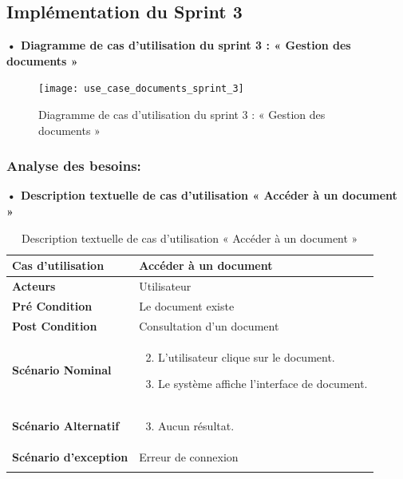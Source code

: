 \subsection{Implémentation du Sprint 3}
\textbf{•	Diagramme de cas d'utilisation du sprint 3 : « Gestion des documents »}

\begin{figure}[H]
  \centering
  \texttt{[image: use\_case\_documents\_sprint\_3]}
  \caption{Diagramme de cas d'utilisation du sprint 3 : « Gestion des documents »}
  \label{fig:UseCaseDiagramSprint3}
\end{figure}


\subsubsection{Analyse des besoins:}
\textbf{•	Description textuelle de cas d'utilisation « Accéder à un document »}

\begin{longtable}{|p{5cm}|p{10cm}|}
\hline
\textbf{Cas d'utilisation}&Accéder à un document\\
\hline
\textbf{Acteurs}&Utilisateur\\
\hline
\textbf{Pré Condition}&Le document existe\\
\hline
\textbf{Post Condition}&Consultation d'un document\\
\hline
\textbf{Scénario Nominal}&
\vspace{-\baselineskip}
\begin{enumerate}
    \setcounter{enumi}{1}
    \item L'utilisateur clique sur le document.
    \item Le système affiche l'interface de document.
    
\end{enumerate}\\
\hline
\textbf{Scénario Alternatif}&
\vspace{-\baselineskip}
\begin{enumerate}
    \setcounter{enumi}{2}
    \item Aucun résultat.
\end{enumerate}\\
\hline
\textbf{Scénario d'exception}&Erreur de connexion\\
\hline
\caption{Description textuelle de cas d'utilisation « Accéder à un document »}
\label{tab:DescriptionTextuelleDeCasDUtilisationAccéderAUnDocument}
\end{longtable}

